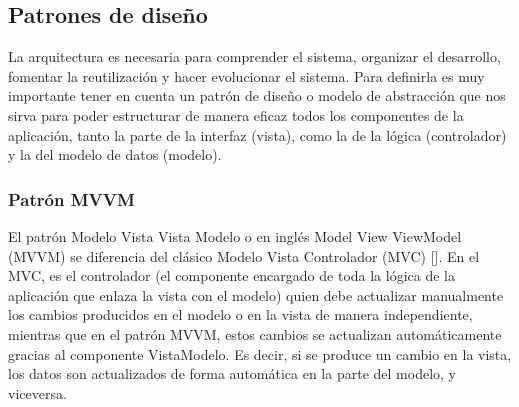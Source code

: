 %

\subsection{Patrones de diseño}

La arquitectura es necesaria para comprender el sistema, organizar el desarrollo, fomentar la reutilización y hacer evolucionar el sistema. Para definirla es muy importante tener en cuenta un patrón de diseño o modelo de abstracción que nos sirva para poder estructurar de manera eficaz todos los componentes de la aplicación, tanto la parte de la interfaz (vista), como la de la lógica (controlador) y la del modelo de datos (modelo).


\subsubsection{Patrón MVVM}

El patrón Modelo Vista Vista Modelo o en inglés Model View ViewModel (MVVM) se diferencia del clásico Modelo Vista Controlador (MVC) [\cite{45}]. En el MVC, es el controlador (el componente encargado de toda la lógica de la aplicación que enlaza la vista con el modelo) quien debe actualizar manualmente los cambios producidos en el modelo o en la vista de manera independiente, mientras que en el patrón MVVM, estos cambios se actualizan automáticamente gracias al componente VistaModelo. Es decir, si se produce un cambio en la vista, los datos son actualizados de forma automática en la parte del modelo, y viceversa.

